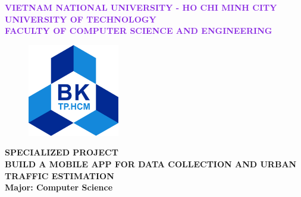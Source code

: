 \documentclass[a4paper]{article}
\begin{document}

\begin{titlepage}
\begin{center}
\large\textcolor{BlueViolet}{\textbf{
VIETNAM NATIONAL UNIVERSITY - HO CHI MINH CITY \\
UNIVERSITY OF TECHNOLOGY \\
FACULTY OF COMPUTER SCIENCE AND ENGINEERING}}
\vspace{1cm}

\begin{figure}[ht]
    \centering
    \includegraphics[width=4cm]{assets/images/hcmut.png}
\end{figure}

\begin{center}
\textbf{{\Large SPECIALIZED PROJECT}}\\
\vspace{1cm}
{\fontsize{36}{20}\selectfont %
\textbf{{BUILD A MOBILE APP FOR DATA COLLECTION AND URBAN TRAFFIC ESTIMATION}}\\
}
\vspace{1cm}
\textbf{{\Large Major: Computer Science}}
\end{center}

\vspace{1cm}


\end{center}
\end{titlepage}
\end{document}

